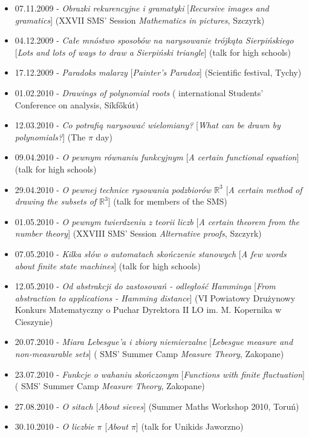 \begin{itemize}
  \item 07.11.2009 - \textsl{Obrazki rekurencyjne i gramatyki} [\textsl{Recursive images and gramatics}] (XXVII SMS' Session \textsl{Mathematics in pictures}, Szczyrk)
  \item 04.12.2009 - \textsl{Całe mnóstwo sposobów na narysowanie trójkąta Sierpińskiego} [\textsl{Lots and lots of ways to draw a Sierpiński triangle}] (talk for high schools)
  \item 17.12.2009 - \textsl{Paradoks malarzy} [\textsl{Painter's Paradox}] (Scientific festival, Tychy)
  \item 01.02.2010 - \textsl{Drawings of polynomial roots} ( international Students' Conference on analysis, Síkfőkút)
  \item 12.03.2010 - \textsl{Co potrafią narysować wielomiany?} [\textsl{What can be drawn by polynomials?}] (The $\pi$ day)
  \item 09.04.2010 - \textsl{O pewnym równaniu funkcyjnym} [\textsl{A certain functional equation}] (talk for high schools)
  \item 29.04.2010 - \textsl{O pewnej technice rysowania podzbiorów $\mathbb{R}^3$} [\textsl{A certain method of drawing the subsets of $\mathbb{R}^3$}] (talk for members of the SMS)
  \item 01.05.2010 - \textsl{O pewnym twierdzeniu z teorii liczb} [\textsl{A certain theorem from the number theory}] (XXVIII SMS' Session \textsl{Alternative proofs}, Szczyrk)
  \item 07.05.2010 - \textsl{Kilka słów o automatach skończenie stanowych} [\textsl{A few words about finite state machines}] (talk for high schools)
  \item 12.05.2010 - \textsl{Od abstrakcji do zastosowań - odległość Hamminga} [\textsl{From abstraction to applications - Hamming distance}] (VI Powiatowy Drużynowy Konkurs Matematyczny o Puchar Dyrektora II LO im. M. Kopernika w Cieszynie)
  \item 20.07.2010 - \textsl{Miara Lebesgue'a i zbiory niemierzalne} [\textsl{Lebesgue measure and non-measurable sets}] ( SMS' Summer Camp \textsl{Measure Theory}, Zakopane)
  \item 23.07.2010 - \textsl{Funkcje o wahaniu skończonym} [\textsl{Functions with finite fluctuation}] ( SMS' Summer Camp \textsl{Measure Theory}, Zakopane)
  \item 27.08.2010 - \textsl{O sitach} [\textsl{About sieves}] (Summer Maths Workshop 2010, Toruń)
  \item 30.10.2010 - \textsl{O liczbie $\pi$} [\textsl{About $\pi$}] (talk for Unikids Jaworzno)

\end{itemize}
